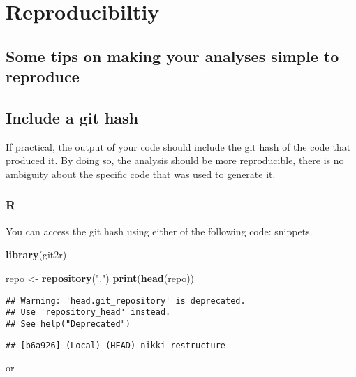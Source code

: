 \documentclass[]{book}
\newenvironment{Shaded}{\begin{snugshade}}{\end{snugshade}}
\newcommand{\KeywordTok}[1]{\textcolor[rgb]{0.13,0.29,0.53}{\textbf{#1}}}
\newcommand{\NormalTok}[1]{#1}
\newcommand{\StringTok}[1]{\textcolor[rgb]{0.31,0.60,0.02}{#1}}
\begin{document}
\hypertarget{reproduce}{%
\section{Reproducibiltiy}\label{reproduce}}

\hypertarget{some-tips-on-making-your-analyses-simple-to-reproduce}{%
\subsection{Some tips on making your analyses simple to reproduce}\label{some-tips-on-making-your-analyses-simple-to-reproduce}}

\hypertarget{include-a-git-hash}{%
\subsection{Include a git hash}\label{include-a-git-hash}}

If practical, the output of your code should include the git hash
of the code that produced it. By doing so, the analysis should be
more reproducible, there is no ambiguity about the specific code
that was used to generate it.

\hypertarget{r}{%
\subsubsection{R}\label{r}}

You can access the git hash using either of the following code:
snippets.

\begin{Shaded}
\begin{Highlighting}[]
\KeywordTok{library}\NormalTok{(git2r)}

\NormalTok{repo <-}\StringTok{ }\KeywordTok{repository}\NormalTok{(}\StringTok{"."}\NormalTok{)}
\KeywordTok{print}\NormalTok{(}\KeywordTok{head}\NormalTok{(repo))}
\end{Highlighting}
\end{Shaded}

\begin{verbatim}
## Warning: 'head.git_repository' is deprecated.
## Use 'repository_head' instead.
## See help("Deprecated")
\end{verbatim}

\begin{verbatim}
## [b6a926] (Local) (HEAD) nikki-restructure
\end{verbatim}

or
\end{document}
